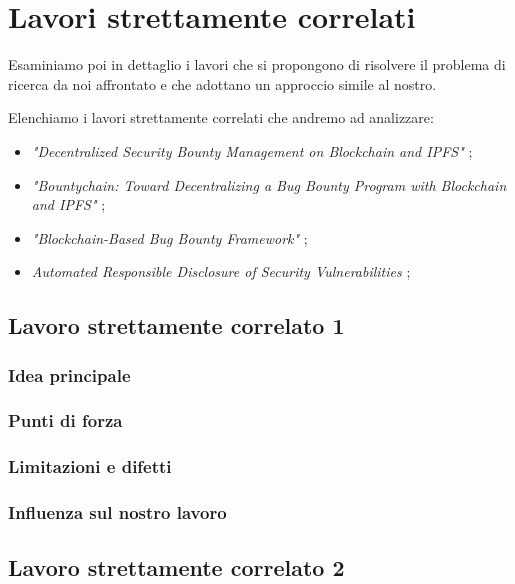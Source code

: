 \section{Lavori strettamente correlati}

Esaminiamo poi in dettaglio i lavori che si propongono di risolvere il problema di ricerca da noi affrontato e che adottano un approccio simile al nostro.

\medskip

Elenchiamo i lavori strettamente correlati che andremo ad analizzare:

\begin{itemize}

\item \textit{"Decentralized Security Bounty Management on Blockchain and IPFS"} \cite{hoffman2020bountychain};

\item \textit{"Bountychain: Toward Decentralizing a Bug Bounty Program with Blockchain and IPFS"} \cite{hoffman2021bountychain};

\item \textit{"Blockchain-Based Bug Bounty Framework"} \cite{badash2021blockbounty};

\item \textit{Automated Responsible Disclosure of Security Vulnerabilities} \cite{lisi2022ard};

\end{itemize}

\subsection{Lavoro strettamente correlato 1}
\subsubsection{Idea principale}
\subsubsection{Punti di forza}
\subsubsection{Limitazioni e difetti}
\subsubsection{Influenza sul nostro lavoro}

\subsection{Lavoro strettamente correlato 2}
